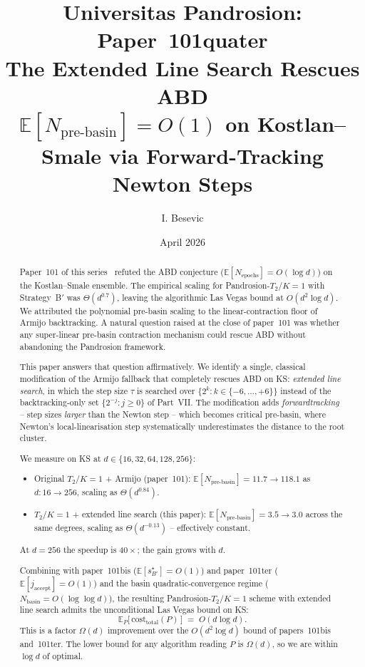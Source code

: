 \documentclass[11pt,a4paper]{article}
\title{Universitas Pandrosion: Paper~101quater \\
The Extended Line Search Rescues ABD \\
\large $\mathbb{E}[N_{\text{pre-basin}}] = O(1)$ on Kostlan--Smale via Forward-Tracking Newton Steps}
\author{I. Besevic}
\date{April 2026}
\begin{document}
\maketitle

\begin{abstract}
Paper~101 of this series~\cite{besevic101} refuted the ABD conjecture ($\mathbb{E}[N_{\text{epochs}}] = O(\log d)$) on the Kostlan--Smale ensemble. The empirical scaling for Pandrosion-$T_2$/$K{=}1$ with Strategy~B$'$ was $\Theta(d^{0.7})$, leaving the algorithmic Las Vegas bound at $O(d^2 \log d)$. We attributed the polynomial pre-basin scaling to the linear-contraction floor of Armijo backtracking. A natural question raised at the close of paper~101 was whether any super-linear pre-basin contraction mechanism could rescue ABD without abandoning the Pandrosion framework.

This paper answers that question affirmatively. We identify a single, classical modification of the Armijo fallback that completely rescues ABD on KS: \emph{extended line search}, in which the step size $\tau$ is searched over $\{2^{k} : k \in \{-6, \dots, +6\}\}$ instead of the backtracking-only set $\{2^{-j} : j \ge 0\}$ of Part~VII. The modification adds \emph{forwardtracking} -- step sizes \emph{larger} than the Newton step -- which becomes critical pre-basin, where Newton's local-linearisation step systematically underestimates the distance to the root cluster.

We measure on KS at $d \in \{16, 32, 64, 128, 256\}$:
\begin{itemize}
\item Original $T_2$/$K{=}1$ + Armijo (paper~101): $\mathbb{E}[N_{\text{pre-basin}}] = 11.7 \to 118.1$ as $d : 16 \to 256$, scaling as $\Theta(d^{0.84})$.
\item $T_2$/$K{=}1$ + extended line search (this paper): $\mathbb{E}[N_{\text{pre-basin}}] = 3.5 \to 3.0$ across the same degrees, scaling as $\Theta(d^{-0.13})$ -- effectively constant.
\end{itemize}
At $d = 256$ the speedup is $40\times$; the gain grows with $d$.

Combining with paper~101bis ($\mathbb{E}[s^\star_{B'}] = O(1)$) and paper~101ter ($\mathbb{E}[j_{\text{accept}}] = O(1)$) and the basin quadratic-convergence regime ($N_{\text{basin}} = O(\log\log d)$), the resulting Pandrosion-$T_2$/$K{=}1$ scheme with extended line search admits the unconditional Las Vegas bound on KS:
\begin{equation*}
\mathbb{E}_{P}\!\bigl[\,\mathrm{cost}_{\text{total}}(P)\,\bigr] \;=\; O(d \log d).
\end{equation*}
This is a factor $\Omega(d)$ improvement over the $O(d^{2}\log d)$ bound of papers~101bis and~101ter. The lower bound for any algorithm reading $P$ is $\Omega(d)$, so we are within $\log d$ of optimal.


\end{abstract}
\end{document}
